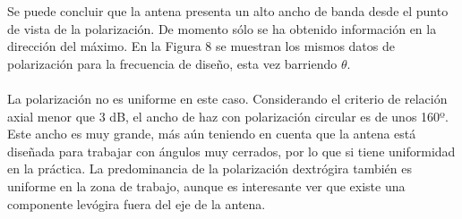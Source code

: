 \documentclass[12pt]{article}
\begin{document}
Se puede concluir que la antena presenta un alto ancho de banda desde el punto de vista de la polarización. De momento sólo se ha obtenido información en la dirección del máximo. En la Figura 8 se muestran los mismos datos de polarización para la frecuencia de diseño, esta vez barriendo $\theta$.\\\\
La polarización no es uniforme en este caso. Considerando el criterio de relación axial menor que 3 dB, el ancho de haz con polarización circular es de unos 160º. Este ancho es muy grande, más aún teniendo en cuenta que la antena está diseñada para trabajar con ángulos muy cerrados, por lo que si tiene uniformidad en la práctica. La predominancia de la polarización dextrógira también es uniforme en la zona de trabajo, aunque es interesante ver que existe una componente levógira fuera del eje de la antena.\\
\end{document}
